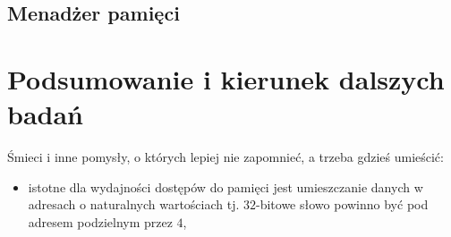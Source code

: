 \documentclass[12pt,a4paper,titlepage,twoside]{mwart}
\begin{document}
\newpage

\subsection{Menadżer pamięci}

\newpage


\section{Podsumowanie i kierunek dalszych badań}
\hypertarget{Podsumowanie}{}

Śmieci i inne pomysły, o których lepiej nie zapomnieć, a trzeba gdzieś umieścić:
\begin{itemize}
\item istotne dla wydajności dostępów do pamięci jest umieszczanie danych w
adresach o naturalnych wartościach tj. $32$-bitowe słowo powinno być pod
adresem podzielnym przez $4$,
\end{itemize}
\end{document}
